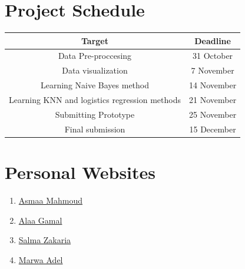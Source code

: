 \documentclass[a4paper, 11pt, oneside]{article} %
\begin{document}
\section{Project Schedule}
\begin{table}[H]
\centering %
\begin{tabular}{c c } %
\hline\hline %
Target & Deadline \\ [0.5ex] %
\hline %
Data Pre-proccesing & 31 October \\ %
Data visualization & 7 November \\
Learning Naive Bayes method & 14 November  \\
Learning KNN and logistics regression methods   & 21 November \\
Submitting Prototype & 25 November \\
Final submission & 15 December \\ [1ex] %
\hline %
\end{tabular}
\label{table:nonlin} %
\end{table}
\vfil


\section{Personal Websites}
\begin{enumerate}
\item \href{https://asmaamahmoud12.github.io/Asmaa-Mahmoud/}{Asmaa Mahmoud}
\item \href{https://alaagamal98.github.io/AlaaGamal/}{Alaa Gamal}
\item \href{https://salmazakariia.github.io/SalmaZakaria/}{Salma Zakaria}
\item \href{https://marwaayosiif.github.io/MarwaYoussif/}{Marwa Adel}
\end{enumerate}
\end{document}
